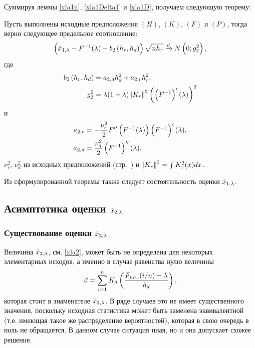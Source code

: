 \documentclass[a4paper,14pt,russian]{article}
\begin{document}
Суммируя леммы \eqref{xla1n}, \eqref{xla1Delta1} и \eqref{xla1D}, получаем следующую теорему:
\begin{theorem}
Пусть выполнены исходные предположения $(H)$, $(K)$, $(F)$ и $(P)$, тогда верно следующее предельное соотношение:
  $$
  \left(\hat{x}_{1,\lambda} -F^{-1}(\lambda) -b_2\left(h_r,h_d\right)\right)\sqrt{n h_r} \xrightarrow{d} N\left(0;g_2^2\right),
  $$
  где
 \begin{align*}
  b_2\left(h_r,h_d\right) &= a_{2,d} h_d^2 + a_{2,r} h_r^2,\\
  g_2^2 &= \lambda (1- \lambda) \norm{K_r}^2 \left(\left(F^{-1}\right)'(\lambda)\right)^2
\end{align*}
и
 \begin{align*}
  a_{2,r} &= -\frac{\nu_r^2}{2} F''\left(F^{-1}(\lambda)\right)\left(F^{-1}\right)'(\lambda),\\
  a_{2,d}&= \frac{\nu_d^2}{2} \left(F^{-1}\right)''(\lambda),
\end{align*}\label{Theorem1}
$\nu_r^2$, $\nu_d^2$ из исходных предположений (стр.~\pageref{nu}) и $\norm{K_r}^2 = \int K_r^2(x)dx$.
\end{theorem}
\begin{remark}
  Из сформулированной теоремы также следует состоятельность оценки $\hat{x}_{1,\lambda}$.
\end{remark}
\newpage

\subsection{Асимптотика оценки $\hat{x}_{2,\lambda}$ }
\subsubsection{Существование оценки $\hat{x}_{2,\lambda}$}
Величина $\hat{x}_{2,\lambda} $, см. \eqref{xla2}, может быть не определена для некоторых элементарных исходов, а именно в случае равенства нулю величины
\begin{equation}
  \beta = \sum_{i=1}^n K_d\left(\frac{F_{n h_r}(i/n)-\lambda}{h_d}\right),
  \label{beta}
\end{equation}
которая стоит в знаменателе $\hat{x}_{2,\lambda}$.
В ряде случаев это не имеет существенного значения, поскольку исходная статистика может быть заменена эквивалентной (т.е. имеющая такое же распределение вероятностей), которая в свою очередь в ноль не обращается. В данном случае ситуация иная, но и она допускает схожее решение.
\end{document}
